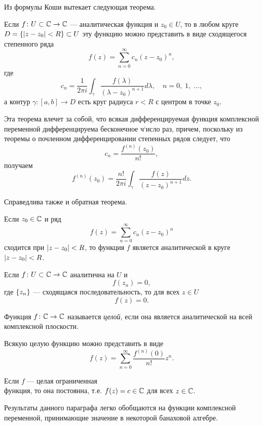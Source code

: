 Из формулы Коши вытекает следующая теорема.
\begin{theorem}\label{th:analytic}
    Если $f \colon U \subset \mathbb{C} \to \mathbb{C}$ --- аналитическая функция и $z_0 \in U$,
    то в любом круге $D = \left\{\left|z-z_0\right| < R\right\} \subset U$ эту функцию можно представить в
    виде сходящегося степенного ряда
    \[ f(z) = \sum_{n=0}^\infty c_n (z - z_0)^n, \]
    где 
    \[ c_n = \dfrac{1}{2\pi i} \int_\gamma \dfrac{f(\lambda)}{(\lambda - z_0)^{n+1}} d \lambda,
        \quad n = 0,\; 1,\; \dotsc, \]
    а контур $\gamma \colon [a, b] \to D$ есть круг радиуса $r < R$ с центром в точке $z_0$. 
\end{theorem}

Эта теорема влечет за собой, что всякая дифференцируемая функция комплексной переменной
дифференцируема бесконечное ч`исло раз, причем, поскольку
из теоремы о почленном дифференцировании степенных рядов следует, что
\[ c_n = \frac{f^{(n)}(z_0)}{n!}, \]
получаем
\[ f^{(n)}(z_0) = \dfrac{n!}{2\pi i} 
    \int_\gamma \dfrac{f(z)}{(z - z_0)^{n+1}} d z. \]

Справедлива также и обратная теорема.
\begin{theorem}\label{th:tayloranalytic}
    Если $z_0 \in \mathbb{C}$ и ряд
    \[ f(z) = \sum_{n=0}^\infty c_n (z - z_0)^n \]
    сходится при $\left|z-z_0\right| < R$,
    то функция $f$ является аналитической в круге $\left|z - z_0\right| < R$.
\end{theorem}

\begin{theorem}[единственности]
    Если $f \colon U \subset \mathbb{C} \to \mathbb{C}$ аналитична на $U$ и
    \[ f(z_n) = 0, \]
    где $\left\{z_n\right\}$ --- сходящаяся последовательность, то для всех $z \in U$
    \[ f(z) = 0. \]
\end{theorem}

\begin{definition}
    Функция $f \colon \mathbb{C} \to \mathbb{C}$ называется \emph{целой}, если
    она является аналитической на всей комплексной плоскости.
\end{definition}

Всякую целую функцию можно представить в виде
\[ f(z) = \sum_{n=0}^\infty \frac{f^{(n)}(0)}{n!} z^n. \]

\begin{theorem}[Лиувилля]\label{th:liouville}
    Если $f$ --- целая ограниченная\\функция, то она постоянна, т.е. $f(z) = c \in \mathbb{C}$ для всех $z \in \mathbb{C}$.
\end{theorem}

Результаты данного параграфа легко обобщаются на функции комплексной переменной, принимающие
значение в некоторой банаховой алгебре.
